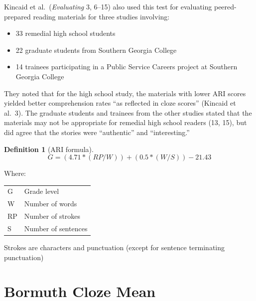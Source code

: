 \documentclass[
]{book}
\providecommand{\tightlist}{%
  \setlength{\itemsep}{0pt}\setlength{\parskip}{0pt}}
\theoremstyle{definition}
\newtheorem{definition}{Definition}[chapter]
\theoremstyle{definition}
\theoremstyle{definition}
\theoremstyle{definition}
\theoremstyle{remark}
\begin{document}
Kincaid et al.~(\emph{Evaluating} 3, 6--15) also used this test for evaluating peered-prepared reading materials for three studies involving:

\begin{itemize}
\tightlist
\item
  33 remedial high school students
\item
  22 graduate students from Southern Georgia College
\item
  14 trainees participating in a Public Service Careers project at Southern Georgia College
\end{itemize}

They noted that for the high school study, the materials with lower ARI scores yielded better comprehension rates ``as reflected in cloze scores'' (Kincaid et al.~3). The graduate students and trainees from the other studies stated that the materials may not be appropriate for remedial high school readers (13, 15), but did agree that the stories were ``authentic'' and ``interesting.''

\begin{definition}[ARI formula]
\protect\hypertarget{def:ari}{}{\label{def:ari} {} }\[
G = (4.71 * (RP/W)) + (0.5 * (W/S)) - 21.43
\]
\end{definition}

Where:

\begin{table}
\centering
\begin{threeparttable}
\begin{tabular}[t]{l>{\raggedright\arraybackslash}p{10cm}}
\toprule
G & Grade level\\
W & Number of words\\
RP & Number of strokes\\
S & Number of sentences\\
\bottomrule
\end{tabular}
\begin{tablenotes}
\item[1] Strokes are characters and punctuation (except for sentence terminating punctuation)
\end{tablenotes}
\end{threeparttable}
\end{table}


\newpage

\hypertarget{bormuth-cloze-mean-machine-passage}{%
\section{\texorpdfstring{Bormuth Cloze Mean}{Bormuth Cloze Mean}}\label{bormuth-cloze-mean-machine-passage}}
\end{document}
